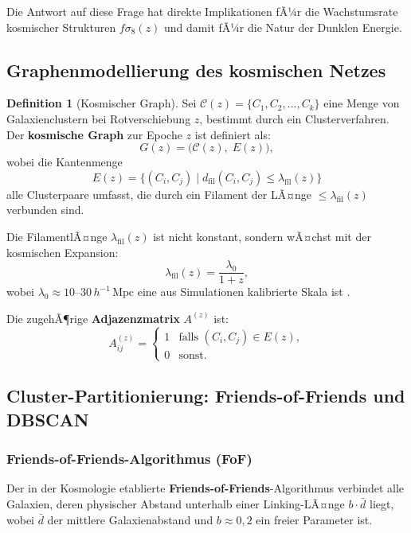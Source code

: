 ﻿\documentclass[a4paper,12pt]{article}
\theoremstyle{definition}
\newtheorem{definition}{Definition}[section]
\theoremstyle{remark}
\begin{document}
Die Antwort auf diese Frage hat direkte Implikationen fÃ¼r die Wachstumsrate
kosmischer Strukturen $f\sigma_8(z)$ und damit fÃ¼r die Natur der
Dunklen Energie.

\subsection{Graphenmodellierung des kosmischen Netzes}

\begin{definition}[Kosmischer Graph]
  Sei $\mathcal{C}(z) = \{C_1, C_2, \ldots, C_k\}$ eine Menge von
  Galaxienclustern bei Rotverschiebung $z$, bestimmt durch ein
  Clusterverfahren. Der \textbf{kosmische Graph} zur Epoche $z$ ist definiert als:
  \[
    G(z) = \bigl(\mathcal{C}(z),\; E(z)\bigr),
  \]
  wobei die Kantenmenge
  \[
    E(z) = \bigl\{(C_i, C_j) \mid d_\mathrm{fil}(C_i, C_j) \leq \lambda_\mathrm{fil}(z)\bigr\}
  \]
  alle Clusterpaare umfasst, die durch ein Filament der LÃ¤nge
  $\leq \lambda_\mathrm{fil}(z)$ verbunden sind.
\end{definition}

Die FilamentlÃ¤nge $\lambda_\mathrm{fil}(z)$ ist nicht konstant, sondern
wÃ¤chst mit der kosmischen Expansion:
\begin{equation}
  \lambda_\mathrm{fil}(z) = \frac{\lambda_0}{1+z},
\end{equation}
wobei $\lambda_0 \approx 10$--$30\,h^{-1}\,\mathrm{Mpc}$ eine aus Simulationen
kalibrierte Skala ist \cite{dodelson2003}.

Die zugehÃ¶rige \textbf{Adjazenzmatrix} $A^{(z)}$ ist:
\begin{equation}
  \label{eq:adj_cosmic}
  A^{(z)}_{ij} =
  \begin{cases}
    1 & \text{falls } (C_i, C_j) \in E(z), \\
    0 & \text{sonst.}
  \end{cases}
\end{equation}

\subsection{Cluster-Partitionierung: Friends-of-Friends und DBSCAN}

\subsubsection*{Friends-of-Friends-Algorithmus (FoF)}

Der in der Kosmologie etablierte \textbf{Friends-of-Friends}-Algorithmus
\cite{weinberg2013} verbindet alle Galaxien, deren physischer Abstand unterhalb
einer Linking-LÃ¤nge $b \cdot \bar{d}$ liegt, wobei $\bar{d}$ der mittlere
Galaxienabstand und $b \approx 0{,}2$ ein freier Parameter ist.
\end{document}
